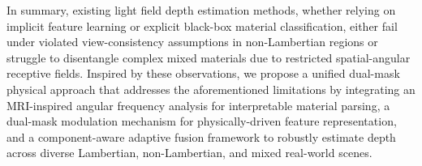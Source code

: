 In summary, existing light field depth estimation methods, whether relying on implicit feature learning or explicit black-box material classification, either fail under violated view-consistency assumptions in non-Lambertian regions or struggle to disentangle complex mixed materials due to restricted spatial-angular receptive fields. Inspired by these observations, we propose a unified dual-mask physical approach that addresses the aforementioned limitations by integrating an MRI-inspired angular frequency analysis for interpretable material parsing, a dual-mask modulation mechanism for physically-driven feature representation, and a component-aware adaptive fusion framework to robustly estimate depth across diverse Lambertian, non-Lambertian, and mixed real-world scenes.